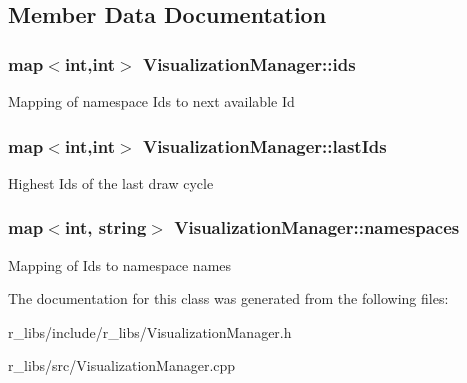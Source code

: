 \subsection{Member Data Documentation}
\hypertarget{classVisualizationManager_a043ed969cfc739b44ff494c04fa2dbab}{
\subsubsection[{ids}]{\setlength{\rightskip}{0pt plus 5cm}map$<$int,int$>$ Visualization\-Manager\-::ids\hspace{0.3cm}{\ttfamily [private]}}}\label{classVisualizationManager_a043ed969cfc739b44ff494c04fa2dbab}
Mapping of namespace Ids to next available Id \hypertarget{classVisualizationManager_a0a7d5e6613a54f37fefb6c4322ec434a}{
\subsubsection[{last\-Ids}]{\setlength{\rightskip}{0pt plus 5cm}map$<$int,int$>$ Visualization\-Manager\-::last\-Ids\hspace{0.3cm}{\ttfamily [private]}}}\label{classVisualizationManager_a0a7d5e6613a54f37fefb6c4322ec434a}
Highest Ids of the last draw cycle \hypertarget{classVisualizationManager_a73b79150d1efd76f132313088b99f172}{
\subsubsection[{namespaces}]{\setlength{\rightskip}{0pt plus 5cm}map$<$int, string$>$ Visualization\-Manager\-::namespaces\hspace{0.3cm}{\ttfamily [private]}}}\label{classVisualizationManager_a73b79150d1efd76f132313088b99f172}
Mapping of Ids to namespace names 

The documentation for this class was generated from the following files\-:\begin{DoxyCompactItemize}
\item 
r\-\_\-libs/include/r\-\_\-libs/Visualization\-Manager.\-h\item 
r\-\_\-libs/src/Visualization\-Manager.\-cpp\end{DoxyCompactItemize}
